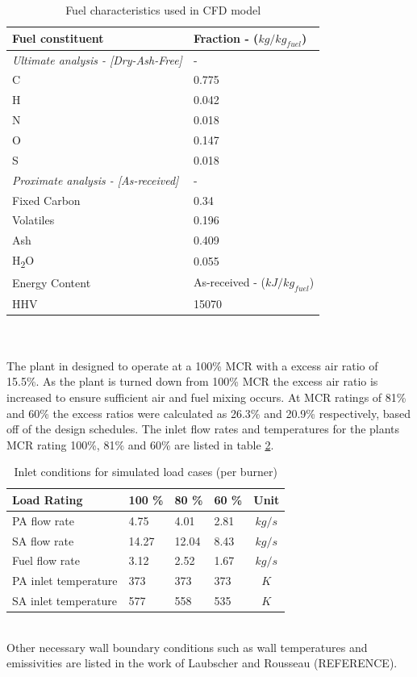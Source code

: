\documentclass{webofc}
\begin{document}
\begin{table}[h!]
\centering
\caption{Fuel characteristics used in CFD model} \label{tab_fuel}
\begin{tabular}{ll}
\hline
Fuel constituent & Fraction - ($kg/kg_{fuel}$)   \\
\hline
\textit{Ultimate analysis - [Dry-Ash-Free]} & -  \\
C & 0.775 \\
H & 0.042 \\
N & 0.018 \\
O & 0.147 \\
S & 0.018 \\
\textit{Proximate analysis - [As-received]} & -\\
Fixed Carbon & 0.34\\
Volatiles & 0.196\\
Ash & 0.409\\
H\textsubscript{2}O & 0.055\\
\hline
Energy Content & As-received - ($kJ/kg_{fuel}$)\\
\hline
HHV & 15070 \\
\hline
\end{tabular}
\end{table}\\
\\
The plant in designed to operate at a 100\% MCR with a excess air ratio of 15.5\%. As the plant is turned down from 100\% MCR the excess air ratio is increased to ensure sufficient air and fuel mixing occurs. At MCR ratings of 81\% and 60\% the excess ratios were calculated as 26.3\% and 20.9\% respectively, based off of the design schedules. The inlet flow rates and temperatures for the plants MCR rating 100\%, 81\% and 60\% are listed in table \ref{tab_inlets}.\\
\begin{table}[h!]
\centering
\caption{Inlet conditions for simulated load cases (per burner)}\label{tab_inlets}       
\begin{tabular}{llllc}
\hline
Load Rating & 100 \% & 80 \% & 60 \% & Unit  \\
\hline
PA flow rate & 4.75 & 4.01 & 2.81 & $kg/s$   \\
SA flow rate & 14.27 & 12.04 & 8.43 & $kg/s$ \\
Fuel flow rate & 3.12 & 2.52 & 1.67 & $kg/s$ \\
PA inlet temperature & 373 & 373 & 373 & $K$ \\
SA inlet temperature & 577 &558 & 535 & $K$  \\
\hline
\end{tabular}
\end{table}\\
Other necessary wall boundary conditions such as wall temperatures and emissivities are listed in the work of Laubscher and Rousseau (REFERENCE).
\end{document}
